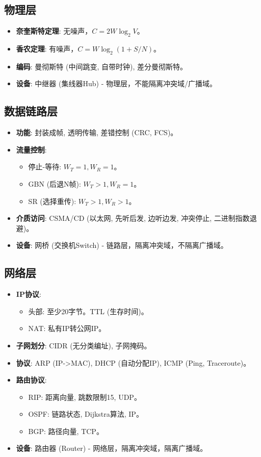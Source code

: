 \documentclass[cn,hazy,blue,12pt,screen,normal]{elegantnote}
\begin{document}
\subsection{物理层}
\begin{itemize}
    \item \textbf{奈奎斯特定理}: 无噪声，$C = 2W \log_2 V$。
    \item \textbf{香农定理}: 有噪声，$C = W \log_2 (1+S/N)$。
    \item \textbf{编码}: 曼彻斯特 (中间跳变, 自带时钟), 差分曼彻斯特。
    \item \textbf{设备}: 中继器 (集线器Hub) - 物理层，不能隔离冲突域/广播域。
\end{itemize}

\subsection{数据链路层}
\begin{itemize}
    \item \textbf{功能}: 封装成帧, 透明传输, 差错控制 (CRC, FCS)。
    \item \textbf{流量控制}:
    \begin{itemize}
        \item 停止-等待: $W_T=1, W_R=1$。
        \item GBN (后退N帧): $W_T > 1, W_R=1$。
        \item SR (选择重传): $W_T > 1, W_R > 1$。
    \end{itemize}
    \item \textbf{介质访问}: CSMA/CD (以太网, 先听后发, 边听边发, 冲突停止, 二进制指数退避)。
    \item \textbf{设备}: 网桥 (交换机Switch) - 链路层，隔离冲突域，不隔离广播域。
\end{itemize}

\subsection{网络层}
\begin{itemize}
    \item \textbf{IP协议}:
    \begin{itemize}
        \item 头部: 至少20字节。TTL (生存时间)。
        \item NAT: 私有IP转公网IP。
    \end{itemize}
    \item \textbf{子网划分}: CIDR (无分类编址), 子网掩码。
    \item \textbf{协议}: ARP (IP->MAC), DHCP (自动分配IP), ICMP (Ping, Traceroute)。
    \item \textbf{路由协议}:
    \begin{itemize}
        \item RIP: 距离向量, 跳数限制15, UDP。
        \item OSPF: 链路状态, Dijkstra算法, IP。
        \item BGP: 路径向量, TCP。
    \end{itemize}
    \item \textbf{设备}: 路由器 (Router) - 网络层，隔离冲突域，隔离广播域。
\end{itemize}
\end{document}
